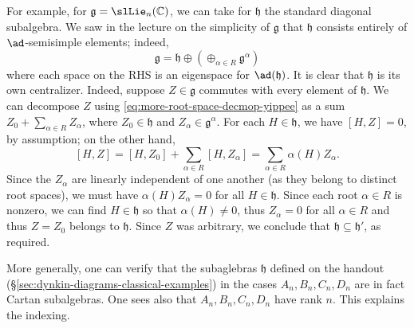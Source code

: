 \documentclass[reqno]{amsart} 
\begin{document}
\begin{enumerate}
  For example, for $\mathfrak{g} = \slLie_n(\mathbb{C})$, we can take for $\mathfrak{h}$ the standard diagonal subalgebra.  We saw in the lecture on the simplicity of $\mathfrak{g}$ that $\mathfrak{h}$ consists entirely of $\ad$-semisimple elements; indeed,
  \begin{equation}\label{eq:more-root-space-decmop-yippee}
    \mathfrak{g} = \mathfrak{h} \oplus (\oplus_{\alpha \in R} \mathfrak{g}^\alpha)
  \end{equation}
  where each space on the RHS is an eigenspace for $\ad(\mathfrak{h})$.  It is clear that $\mathfrak{h}$ is its own centralizer.  Indeed, suppose $Z \in \mathfrak{g}$ commutes with every element of $\mathfrak{h}$.  We can decompose $Z$ using \eqref{eq:more-root-space-decmop-yippee} as a sum $Z_0 + \sum_{\alpha \in R} Z_\alpha$, where $Z_0 \in \mathfrak{h}$ and $Z_\alpha \in \mathfrak{g}^\alpha$.  For each $H \in \mathfrak{h}$, we have $[H,Z] = 0$, by assumption; on the other hand,
  \begin{equation}\label{eq:eigenspace-decomp-relevant-fro-checking-maximality}
    {} [H,Z]
    = [H,Z_0] + \sum_{\alpha \in R} [H,Z_\alpha]
    = \sum_{\alpha \in R} \alpha(H) Z_\alpha.
  \end{equation}
  Since the $Z_\alpha$ are linearly independent of one another (as they belong to distinct root spaces), we must have $\alpha(H) Z_\alpha = 0$ for all $H \in \mathfrak{h}$.  Since each root $\alpha \in R$ is nonzero, we can find $H \in \mathfrak{h}$ so that $\alpha(H) \neq 0$, thus $Z_\alpha = 0$ for all $\alpha \in R$ and thus $Z = Z_0$ belongs to $\mathfrak{h}$.  Since $Z$ was arbitrary, we conclude that $\mathfrak{h} \subseteq \mathfrak{h} '$, as required.

  More generally, one can verify that the subaglebras $\mathfrak{h}$ defined on the handout (\S\ref{sec:dynkin-diagrams-classical-examples}) in the cases $A_n,B_n,C_n,D_n$ are in fact Cartan subalgebras.  One sees also that $A_n, B_n, C_n, D_n$ have rank $n$.  This explains the indexing.


\end{enumerate}
\end{document}
